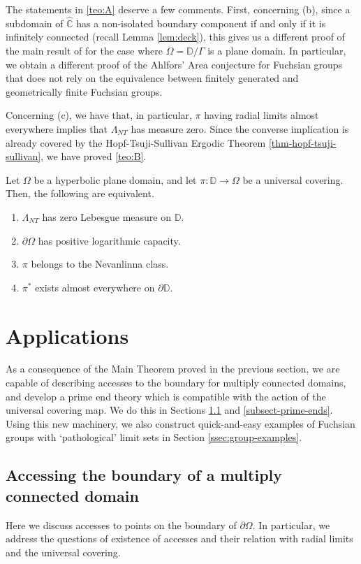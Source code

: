 \documentclass[11pt,a4paper,reqno]{amsart}
\makeatletter
\theoremstyle{plain}
\theoremstyle{definition}
\theoremstyle{plain}
\newcounter{namedthm}
\newenvironment{named}[1]
{\def\namedthmname{#1}%
	\refstepcounter{namedthm}%
	\namedthm\def\@currentlabel{#1}}
{\endnamedthm}
\def\Chat{\widehat{\mathbb{C}}}
\def\DD{\mathbb{D}}
\makeatother
\begin{document}
The statements in \ref{teo:A} deserve a few comments. First, concerning (b), since a subdomain of $\Chat$ has a non-isolated boundary component if and only if it is infinitely connected (recall Lemma \ref{lem:deck}), this gives us a different proof of the main result of \cite{BM74} for the case where $\Omega = \DD/\Gamma$ is a plane domain. In particular, we obtain a different proof of the Ahlfors' Area conjecture for Fuchsian groups that does not rely on the equivalence between finitely generated and geometrically finite Fuchsian groups.
	
Concerning (c), we have that, in particular, $\pi$ having radial limits almost everywhere implies that $\Lambda_{NT}$ has measure zero. Since the converse implication is already covered by the Hopf-Tsuji-Sullivan Ergodic Theorem  \ref{thm-hopf-tsuji-sullivan}, we have proved \ref{teo:B}.
	
\begin{named}{Corollary B}
	Let $\Omega$ be a hyperbolic plane domain, and let $\pi\colon\DD\to\Omega$ be a universal covering. Then, the following are equivalent.
	\begin{enumerate}[label={\normalfont (\alph*)}]
		\item $\Lambda_{NT}$ has zero Lebesgue measure on $\DD$.
		\item $\partial\Omega$ has positive logarithmic capacity.
		\item $\pi$ belongs to the Nevanlinna class.
		\item $\pi^*$ exists almost everywhere on $ \partial\mathbb{D} $.
	\end{enumerate}
\end{named}

\section{Applications}\label{section-applications}
As a consequence of the Main Theorem proved in the previous section, we are capable of describing accesses to the boundary for multiply connected domains,  and develop a prime end theory which is compatible with the action of the universal covering map. We do this in Sections \ref{ssect:accesses} and \ref{subsect-prime-ends}. Using this new machinery, we also construct quick-and-easy examples of Fuchsian groups with `pathological' limit sets in Section \ref{ssec:group-examples}.

\subsection{Accessing the boundary of a multiply connected domain}\label{ssect:accesses}
Here we discuss accesses to points on the boundary of $\partial\Omega$. In particular, we address the questions of existence of accesses and their relation with radial limits and the universal covering.
\end{document}
